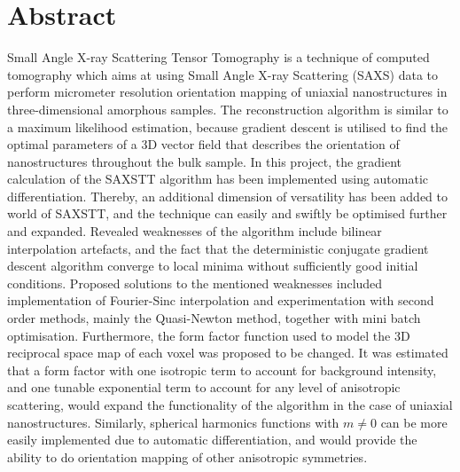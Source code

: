


\begingroup
\let\clearpage\relax
\let\cleardoublepage\relax
\let\cleardoublepage\relax

\chapter*{Abstract}

Small Angle X-ray Scattering Tensor Tomography is a technique of computed tomography
which aims at using Small Angle X-ray Scattering (SAXS) data to perform micrometer resolution orientation mapping
of uniaxial nanostructures in three-dimensional amorphous samples.
The reconstruction algorithm is similar to a maximum likelihood estimation, because gradient descent is utilised to find the optimal parameters of a 3D vector field
that describes the orientation of nanostructures throughout the bulk sample.
In this project, the gradient calculation of the SAXSTT algorithm has been implemented using automatic differentiation.
Thereby, an additional dimension of versatility has been added to world of SAXSTT, and the technique can easily and swiftly be optimised further and expanded.
Revealed weaknesses of the algorithm include bilinear interpolation artefacts,
and the fact that the deterministic conjugate gradient descent algorithm converge to local minima without sufficiently good initial conditions.
Proposed solutions to the mentioned weaknesses included implementation of Fourier-Sinc interpolation and experimentation with second order methods, mainly the Quasi-Newton method, together with mini batch optimisation.
Furthermore, the form factor function used to model the 3D reciprocal space map of each voxel was proposed to be changed.
It was estimated that a form factor with one isotropic term to account for background intensity,
and one tunable exponential term to account for any level of anisotropic scattering, would expand the functionality of the algorithm in the case of uniaxial nanostructures.
\noindent
Similarly, spherical harmonics functions with $m \neq 0$ can be more easily implemented due to automatic differentiation,
and would provide the ability to do orientation mapping of other anisotropic symmetries.

